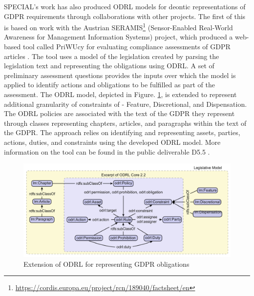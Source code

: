 SPECIAL's work has also produced ODRL models for deontic representations of GDPR requirements through collaborations with other projects. The first of this is based on work with the Austrian SERAMIS\footnote{\url{https://cordis.europa.eu/project/rcn/189040/factsheet/en}} (Sensor-Enabled Real-World Awareness for Management Information Systems) project, which produced a web-based tool called PriWUcy for evaluating compliance assessments of GDPR articles \cite{agarwal_legislative_2018}.
The tool uses a model of the legislation created by parsing the legislation text and representing the obligations using ODRL. A set of preliminary assessment questions provides the inputs over which the model is applied to identify actions and obligations to be fulfilled as part of the assessment. The ODRL model, depicted in Figure. \ref{fig:SPECIAL-ODRL}, is extended to represent additional granularity of constraints of - Feature, Discretional, and Dispensation. The ODRL policies are associated with the text of the GDPR they represent through classes representing chapters, articles, and paragraphs within the text of the GDPR. The approach relies on identifying and representing assets, parties, actions, duties, and constraints using the developed ODRL model. More information on the tool can be found in the public deliverable D5.5 \cite{agarwal_d5.5_2017}.
\begin{figure}[htbp]
    \centering
    \includegraphics[width=\linewidth]{img/SPECIAL_ODRL.png}
    \caption{Extension of ODRL for representing GDPR obligations \cite{agarwal_legislative_2018}}
    \label{fig:SPECIAL-ODRL}
\end{figure}

